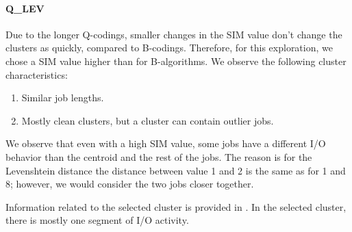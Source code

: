 \documentclass{jhps}
\begin{document}
\FloatBarrier
\paragraph{Q\_LEV}
Due to the longer Q-codings, smaller changes in the SIM value don't change the clusters as quickly, compared to B-codings.
Therefore, for this exploration, we chose a SIM value higher than for B-algorithms.
We observe the following cluster characteristics:
\begin{enumerate}
 \item Similar job lengths.
 \item Mostly clean clusters, but a cluster can contain outlier jobs.
\end{enumerate}

We observe that even with a high SIM value, some jobs have a different I/O behavior than the centroid and the rest of the jobs.
The reason is for the Levenshtein distance the distance between value 1 and 2 is the same as for 1 and 8; however, we would consider the two jobs closer together.

Information related to the selected cluster is provided in .
In the selected cluster, there is mostly one segment of I/O activity.
\end{document}
